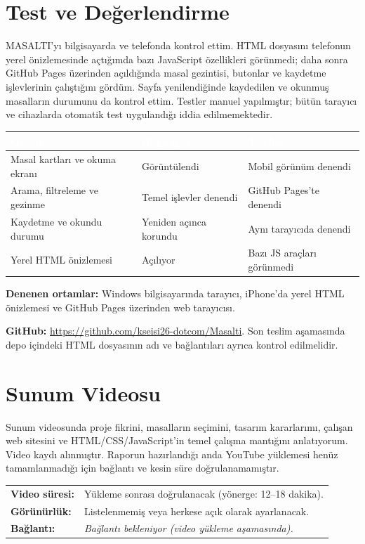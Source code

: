 \documentclass[12pt,a4paper]{article}
\newcommand{\youtubelink}{\textit{Bağlantı bekleniyor (video yükleme aşamasında).}}
\begin{document}
\section{Test ve Değerlendirme}
MASALTI'yı bilgisayarda ve telefonda kontrol ettim. HTML dosyasını telefonun yerel önizlemesinde açtığımda bazı JavaScript özellikleri görünmedi; daha sonra GitHub Pages üzerinden açıldığında masal gezintisi, butonlar ve kaydetme işlevlerinin çalıştığını gördüm. Sayfa yenilendiğinde kaydedilen ve okunmuş masalların durumunu da kontrol ettim. Testler manuel yapılmıştır; bütün tarayıcı ve cihazlarda otomatik test uygulandığı iddia edilmemektedir.
\begin{center}
\begin{tabular}{@{}p{5.7cm}p{3.8cm}p{3.8cm}@{}}
\toprule
\rowcolor{ana}\textcolor{white}{\textbf{Özellik}} & \textcolor{white}{\textbf{Bilgisayar}} & \textcolor{white}{\textbf{Telefon}} \\
\midrule
Masal kartları ve okuma ekranı & Görüntülendi & Mobil görünüm denendi \\
Arama, filtreleme ve gezinme & Temel işlevler denendi & GitHub Pages'te denendi \\
Kaydetme ve okundu durumu & Yeniden açınca korundu & Aynı tarayıcıda denendi \\
Yerel HTML önizlemesi & Açılıyor & Bazı JS araçları görünmedi \\
\bottomrule
\end{tabular}
\end{center}
\textbf{Denenen ortamlar:} Windows bilgisayarında tarayıcı, iPhone'da yerel HTML önizlemesi ve GitHub Pages üzerinden web tarayıcısı.\par
\textbf{GitHub:} \url{https://github.com/kseisi26-dotcom/Masalti}. Son teslim aşamasında depo içindeki HTML dosyasının adı ve bağlantıları ayrıca kontrol edilmelidir.

\section{Sunum Videosu}
Sunum videosunda proje fikrini, masalların seçimini, tasarım kararlarımı, çalışan web sitesini ve HTML/CSS/JavaScript'in temel çalışma mantığını anlatıyorum. Video kaydı alınmıştır. Raporun hazırlandığı anda YouTube yüklemesi henüz tamamlanmadığı için bağlantı ve kesin süre doğrulanamamıştır.
\begin{center}
\begin{tabular}{@{}p{4.2cm}p{9.2cm}@{}}
\textbf{Video süresi:} & Yükleme sonrası doğrulanacak (yönerge: 12--18 dakika). \\
\textbf{Görünürlük:} & Listelenmemiş veya herkese açık olarak ayarlanacak. \\
\textbf{Bağlantı:} & \youtubelink \\
\end{tabular}
\end{center}
\end{document}
